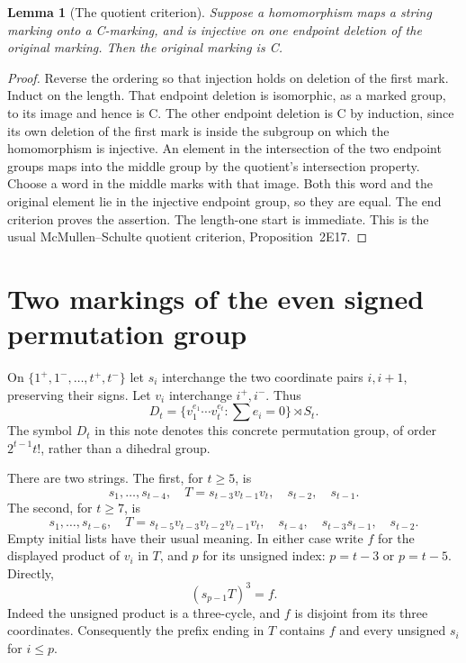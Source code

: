\documentclass[11pt]{article}
\newtheorem{lemma}[theorem]{Lemma}
\begin{document}
\begin{lemma}[The quotient criterion]\label{quotient}
Suppose a homomorphism maps a string marking onto a C-marking, and is
injective on one endpoint deletion of the original marking. Then the
original marking is C.
\end{lemma}
\begin{proof}
Reverse the ordering so that injection holds on deletion of the first
mark. Induct on the length. That endpoint deletion is isomorphic, as a
marked group, to its image and hence is C. The other endpoint deletion
is C by induction, since its own deletion of the first mark is inside
the subgroup on which the homomorphism is injective. An element in the
intersection of the two endpoint groups maps into the middle group
by the quotient's intersection property. Choose a word in the middle
marks with that image. Both this word and the original element lie in
the injective endpoint group, so they are equal. The end criterion
proves the assertion. The length-one start is immediate. This is the
usual McMullen--Schulte quotient criterion, Proposition~2E17.
\end{proof}

\section{Two markings of the even signed permutation group}
On $\{1^+,1^-,\ldots,t^+,t^-\}$ let $s_i$ interchange the two
coordinate pairs $i,i+1$, preserving their signs. Let $v_i$ interchange
$i^+,i^-$. Thus
\[
 D_t=\{v_1^{e_1}\cdots v_t^{e_t}:\textstyle\sum e_i=0\}
       \rtimes S_t.
\]
The symbol $D_t$ in this note denotes this concrete permutation group,
of order $2^{t-1}t!$, rather than a dihedral group.

There are two strings. The first, for $t\ge5$, is
\begin{equation}\label{two}
 s_1,\ldots,s_{t-4},\quad T=s_{t-3}v_{t-1}v_t,
       \quad s_{t-2},\quad s_{t-1}.
\end{equation}
The second, for $t\ge7$, is
\begin{equation}\label{four}
 s_1,\ldots,s_{t-6},\quad
 T=s_{t-5}v_{t-3}v_{t-2}v_{t-1}v_t,
 \quad s_{t-4},\quad s_{t-3}s_{t-1},\quad s_{t-2}.
\end{equation}
Empty initial lists have their usual meaning. In either case write
$f$ for the displayed product of $v_i$ in $T$, and $p$ for its
unsigned index: $p=t-3$ or $p=t-5$. Directly,
\begin{equation}\label{cube}
 (s_{p-1}T)^3=f.
\end{equation}
Indeed the unsigned product is a three-cycle, and $f$ is disjoint
from its three coordinates. Consequently the prefix ending in $T$
contains $f$ and every unsigned $s_i$ for $i\le p$.
\end{document}
